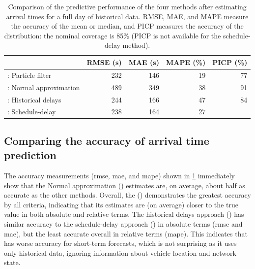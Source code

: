 \begin{knitrout}\small
{}\color{fgcolor}\begin{table}

\caption[Comparison of the predictive performance of the four methods after estimating arrival times for a full day of historical data]{\label{tab:model_results_rmse}Comparison of the predictive performance of the four methods after estimating arrival times for a full day of historical data. RMSE, MAE, and MAPE measure the accuracy of the mean or median, and PICP measures the accuracy of the distribution: the nominal coverage is 85\% (PICP is not available for the schedule-delay method).}
\centering
\fontsize{8}{10}\selectfont
\begin{tabular}[t]{lrrrr}
\toprule
  & RMSE (s) & MAE (s) & MAPE (\%) & PICP (\%)\\
\midrule
\Fpf{}: Particle filter & 232 & 146 & 19 & 77\\
\Fnorm{}: Normal approximation & 489 & 349 & 38 & 91\\
\Fhist{}: Historical delays & 244 & 166 & 47 & 84\\
\Fsched{}: Schedule-delay & 238 & 164 & 27 & \\
\bottomrule
\end{tabular}
\end{table}


\end{knitrout}




\subsection{Comparing the accuracy of arrival time prediction}
\label{sec:prediction_model_comp_stats}

The accuracy measurements (\gls{rmse}, \gls{mae}, and \gls{mape}) shown in \cref{tab:model_results_rmse} immediately show that the Normal approximation (\Fnorm{}) estimates are, on average, about half as accurate as the other methods. Overall, the \pf{} (\Fpf{}) demonstrates the greatest accuracy by all criteria, indicating that its estimates are (on average) closer to the true value in both absolute and relative terms. The historical delays approach (\Fhist{}) has similar accuracy to the schedule-delay approach (\Fsched{}) in absolute terms (\gls{rmse} and \gls{mae}), but the least accurate overall in relative terms (\gls{mape}). This indicates that \Fhist{} has worse accuracy for short-term forecasts, which is not surprising as it uses only historical data, ignoring \rt{} information about vehicle location and network state.


